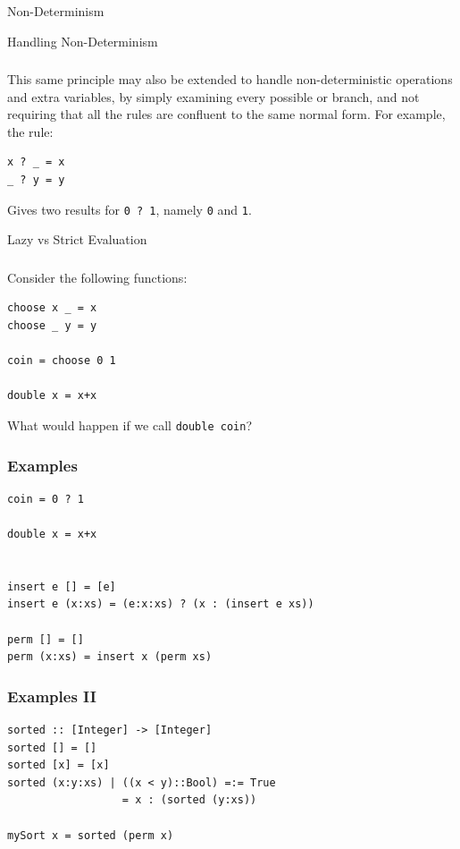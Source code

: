 \documentclass{beamer}
\begin{document}
\begin{section}{Non-Determinism}

\begin{subsection}{Handling Non-Determinism}
\begin{frame}[fragile]
\frametitle{\subsecname}
  This same principle may also be extended to handle non-deterministic operations and extra variables, by simply examining every possible or branch, and not requiring that all the rules are confluent to the same normal form. For example, the rule:

\begin{verbatim}
x ? _ = x
_ ? y = y
\end{verbatim}

  Gives two results for \verb|0 ? 1|, namely \verb|0| and \verb|1|.
  
\end{frame}

\end{subsection}
\begin{subsection}{Lazy vs Strict Evaluation}
\begin{frame}
[fragile]
\frametitle{\subsecname}
  Consider the following functions:
\begin{verbatim}
choose x _ = x
choose _ y = y

coin = choose 0 1

double x = x+x
\end{verbatim}
What would happen if we call \verb|double coin|?
\end{frame}
\begin{frame}
[fragile]
\frametitle{{\subsecname} Examples}
\begin{example}
\begin{verbatim}
coin = 0 ? 1

double x = x+x


insert e [] = [e]
insert e (x:xs) = (e:x:xs) ? (x : (insert e xs))

perm [] = []
perm (x:xs) = insert x (perm xs)
\end{verbatim}
\end{example}
\end{frame}
\begin{frame}
[fragile]
\frametitle{{\subsecname} Examples II}
\begin{example}
\begin{verbatim}
sorted :: [Integer] -> [Integer]
sorted [] = []
sorted [x] = [x]
sorted (x:y:xs) | ((x < y)::Bool) =:= True 
                  = x : (sorted (y:xs))

mySort x = sorted (perm x)
\end{verbatim}
\end{example}
\end{frame}
\end{subsection}
\end{section}
\end{document}
